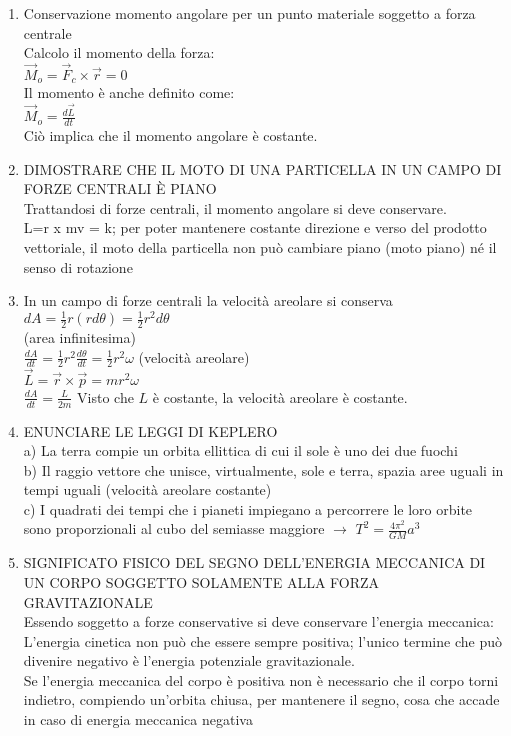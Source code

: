 \documentclass[8pt]{scrreprt}
\begin{document}
\begin{multicols*}{2}
\begin{enumerate}
\item Conservazione momento angolare per un punto materiale soggetto a forza centrale\\
Calcolo il momento della forza:\\
$\vec{M}_o = \vec{F}_c \times \vec{r} = 0$\\
Il momento è anche definito come:\\
$\vec{M}_o = \frac{d\vec{L}}{dt}$\\
Ciò implica che il momento angolare è costante.

\item DIMOSTRARE CHE IL MOTO DI UNA PARTICELLA IN UN CAMPO DI FORZE CENTRALI È PIANO\\
Trattandosi di forze centrali, il momento angolare si deve conservare.\\
L=r x mv = k; per poter mantenere costante direzione e verso del prodotto vettoriale, il moto della particella non può cambiare piano (moto piano) né il senso di rotazione

\item In un campo di forze centrali la velocità areolare si conserva\\
$dA = \frac{1}{2}r (rd\theta) = \frac{1}{2}r^2 d\theta$\\ (area infinitesima)\\
$\frac{dA}{dt} = \frac{1}{2}r^2 \frac{d\theta}{dt} = \frac{1}{2}r^2 \omega$ (velocità areolare)\\
$\vec{L} = \vec{r} \times \vec{p} = mr^2 \omega$\\
$\frac{dA}{dt} = \frac{L}{2m}$ Visto che $L$ è costante, la velocità areolare è costante.

\item ENUNCIARE LE LEGGI DI KEPLERO\\
	a) La terra compie un orbita ellittica di cui il sole è uno dei due fuochi\\
	b) Il raggio vettore che unisce, virtualmente, sole e terra, spazia aree uguali in tempi uguali (velocità areolare costante)\\
	c) I quadrati dei tempi che i pianeti impiegano a percorrere le loro orbite sono proporzionali al cubo del semiasse maggiore $\to$ $T^2 = \frac{4\pi^2}{GM}a^3$

\item SIGNIFICATO FISICO DEL SEGNO DELL’ENERGIA MECCANICA DI UN CORPO SOGGETTO SOLAMENTE ALLA FORZA GRAVITAZIONALE \\
Essendo soggetto a forze conservative si deve conservare l’energia meccanica: {}\\
L’energia cinetica non può che essere sempre positiva; l’unico termine che può divenire negativo è l’energia potenziale gravitazionale.\\
Se l’energia meccanica del corpo è positiva non è necessario che il corpo torni indietro, compiendo un’orbita chiusa, per mantenere il segno, cosa che accade in caso di energia meccanica negativa



\end{enumerate}
\end{multicols*}
\end{document}
